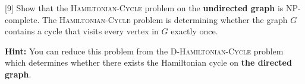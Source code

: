 [9]
Show that the \textsc{Hamiltonian-Cycle} problem on the \textbf{undirected graph} is NP-complete. The \textsc{Hamiltonian-Cycle} problem is determining whether the graph $G$ contains a cycle that visits every vertex in $G$ exactly once. 

\textbf{Hint: } You can reduce this problem from the \textsc{D-Hamiltonian-Cycle} problem which determines whether there exists the Hamiltonian cycle on \textbf{the directed graph}.


\begin{solution}
\\\\\\\\\\\\\\\\\\\\\\\\\\\\\\\\\\\\\\\\\\\\\\\\\\\\\\\\
\end{solution}

